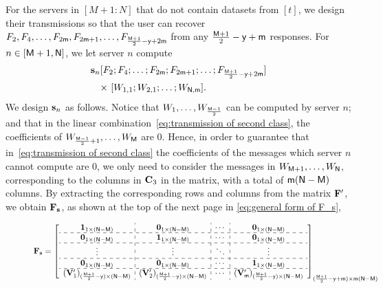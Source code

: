 \documentclass[conference,letterpaper]{IEEEtran}
\begin{document}
For the servers in $[M+1 : N]$ that do not contain datasets from $[t]$, we design their transmissions so that the user can recover $F_2, F_4, \ldots, F_{2{\sf m}}, F_{2{\sf m}+1}, \ldots, F_{\frac{{\sf M}+1}{2} - {\sf y} + 2{\sf m}}$ from any $\frac{{\sf M}+1}{2} - {\sf y} + {\sf m}$ responses.
 For $n \in [{\sf M}+1, {\sf N}]$, we let server $n$ compute
\begin{align}
{\bf s}_n  & [ F_2; F_4; \ldots; F_{2{\sf m}}; F_{2{\sf m}+1}; \ldots; F_{\frac{{\sf M}+1}{2} - {\sf y} + 2{\sf m}} ]  \nonumber \\
& \text{× }  [ W_{1,1}; W_{2,1}; \ldots; W_{{\sf N},{\sf m}} ] .
\label{eq:transmission of second class}
\end{align}
We design ${\bf s}_{n} $ as follows.
Notice that $W_1, \ldots, W_{\frac{{\sf M}-1}{2}}$ can be computed by server $n$; and that in the linear combination~\eqref{eq:transmission of second class}, the coefficients of $W_{\frac{{\sf M}-1}{2}+1}, \ldots, W_{{\sf M}}$ are $0$. 
Hence, in order to guarantee that in~\eqref{eq:transmission of second class} the coefficients of the messages which server $n$ cannot compute are $0$, we only need to consider the messages in $W_{{\sf M}+1}, \ldots, W_{{\sf N}}$, corresponding to the columns in ${\bf C}_3$ in the matrix, with a total of ${\sf m} ({\sf N} - {\sf M})$ columns.
By extracting the corresponding rows and columns from the matrix \( {\bf F}' \), we obtain \( {\bf F}_{\bf s} \), as shown at the top of the next page in \eqref{eq:general form of F_s},
\begin{figure}
\begin{equation}
 {\bf F}_{\bf s} = 
\left[
\begin{array}{c:c:c:c}
{\bf 1}_{1 \times (\Nsf-\Msf)}  & {\bf 0}_{1 \times (\Nsf-\Msf)}  & \cdots & {\bf 0}_{1 \times (\Nsf-\Msf)}   \\ \hdashline
{\bf 0}_{1 \times (\Nsf-\Msf)} &  {\bf 1}_{1 \times (\Nsf-\Msf)}   & \cdots & {\bf 0}_{1 \times (\Nsf-\Msf)}   \\ \hdashline 
 \vdots   & \vdots  &  \ddots & \vdots \\ \hdashline
 {\bf 0}_{1 \times (\Nsf-\Msf)} &   {\bf 0}_{1 \times (\Nsf-\Msf)}    & \cdots &  {\bf 1}_{1 \times (\Nsf-\Msf)} \\ \hdashline
 ({\bf V}'_{1})_{ (\frac{\Msf + 1}{2} - \ysf) \times (\Nsf-\Msf)}  &  ({\bf V}'_{2})_{ (\frac{\Msf + 1}{2} - \ysf) \times (\Nsf-\Msf)}  &   \cdots   &   ({\bf V}'_{\msf})_{ (\frac{\Msf + 1}{2} - \ysf) \times (\Nsf-\Msf)} 
 \end{array}
\right]_{(\frac{\Msf + 1}{2} - \ysf + \msf) \times \msf(\Nsf-\Msf)}
\label{eq:general form of F_s}
\end{equation}

\end{figure}
\end{document}

